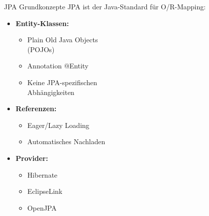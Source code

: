 \begin{concept}{JPA Grundkonzepte}
JPA ist der Java-Standard für O/R-Mapping:

\begin{minipage}[t]{0.5\textwidth}
\begin{itemize}
    \item \textbf{Entity-Klassen:}
    \begin{itemize}
        \item Plain Old Java Objects\\ (POJOs)
        \item Annotation @Entity
        \item Keine JPA-spezifischen\\ Abhängigkeiten
    \end{itemize}
\end{itemize}
\end{minipage}
\begin{minipage}[t]{0.5\textwidth}
\begin{itemize}
    \item \textbf{Referenzen:}
    \begin{itemize}
        \item Eager/Lazy Loading
        \item Automatisches Nachladen
    \end{itemize}
    \item \textbf{Provider:}
    \begin{itemize}
        \item Hibernate
        \item EclipseLink
        \item OpenJPA
    \end{itemize}
\end{itemize}
\end{minipage}
\end{concept}

